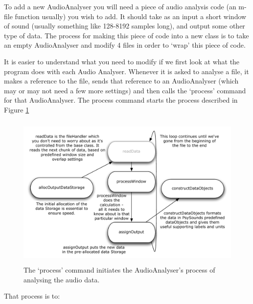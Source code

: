 \documentclass{article}
\begin{document}
To add a new AudioAnalyser you will need a piece of audio analysis code (an m-file function usually) you wish to add. It should take as an input a short window of sound (usually something like 128-8192 samples long), and output some other type of data. The process for making this piece of code into a new class is to take an empty AudioAnalyser and modify 4 files in order to `wrap' this piece of code.  

It is easier to understand what you need to modify if we first look at what the program does with each Audio Analyser. Whenever it is asked to analyse a file, it makes a reference to the file, sends that reference to an AudioAnalyser (which may or may not need a few more settings) and then calls the `process' command for that AudioAnalyser. The process command starts the process described in Figure 	\ref{fig:AADiagram}

\begin{figure}[htbp]
	\centering
		\includegraphics[height=3in]{AudioAnalysersDiagram.pdf}
	\caption{The `process' command initiates the AudioAnalyser's process of analysing the audio data.}
	\label{fig:AADiagram}
\end{figure}

That process is to:
\end{document}

